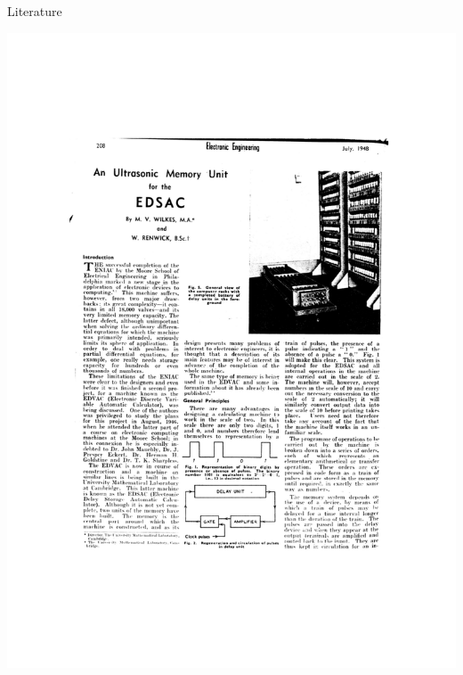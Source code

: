 \documentclass[aspectratio=169,11pt, xcolor={table}]{beamer}
\begin{document}
\begin{frame}{Literature}

	\centering
	\includegraphics[trim={0 9cm 0 0.5cm},clip, height=0.8\textheight]{figs/literature}

\end{frame}
\end{document}
